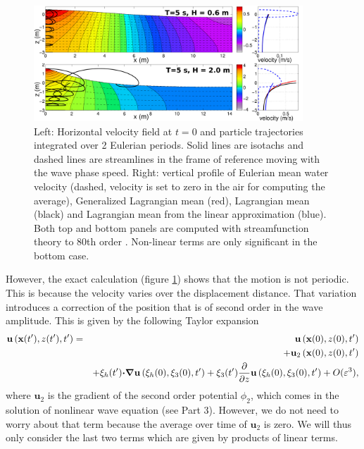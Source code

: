 \begin{figure}[htb]
\centerline{\includegraphics[width=0.9\textwidth]{FIGS_CH_MOMENTUM/Drift_lin_nonlin.pdf}}
  \caption{Left: Horizontal velocity field at $t=0$ and particle trajectories integrated over 2 Eulerian periods. 
Solid lines are isotachs and dashed lines are streamlines in the frame of reference moving with the wave phase speed. Right: vertical profile of Eulerian mean water velocity (dashed, velocity 
is set to zero in the air for computing the average), Generalized Lagrangian mean (red), Lagrangian mean (black) and Lagrangian mean from the linear 
approximation (blue). Both top and bottom panels are computed with streamfunction theory to 80th order \citep{Dalrymple1974}. Non-linear terms are only significant in the bottom case.}
\label{fig:drift_stream}
\end{figure}
However, the exact calculation (figure \ref{fig:drift_stream}) shows that the motion is not periodic. This is because the velocity varies over the displacement 
distance. That variation introduces a correction of the position that is of second order 
in the wave amplitude. This is given by the following Taylor expansion 
\begin{eqnarray}
    \mathbf{u}\left({\mathbf x}(t^\prime),z(t^\prime),t^\prime\right) & =&
    \mathbf{u}\left({\mathbf x}(0),z(0),t^\prime\right) \nonumber\\
   && +  \mathbf{u}_2\left({\mathbf x}(0),z(0),t^\prime\right)  \nonumber\\
    &&+ \xi_h(t')\mbox{\boldmath $\cdot$} \mbox{\boldmath $\nabla$} \mathbf{u}\left(\xi_h(0),\xi_3(0),t^\prime\right)
    +\xi_3(t') \frac{\partial}{\partial z} \mathbf{u}\left(\xi_h(0),\xi_3(0),t^\prime\right)
    + O(\varepsilon^3),\label{eq:Stokes_drift_Taylor}
    \end{eqnarray}
where $\mathbf{u}_2$  is the gradient of the second order potential $\phi_2$,
    which comes in the solution of nonlinear wave equation (see Part 3). 
However, we do not need to worry about that term because the average over time of $\mathbf{u}_2$  is zero. 
We will thus only consider the last two terms which are given by products of linear terms. 

